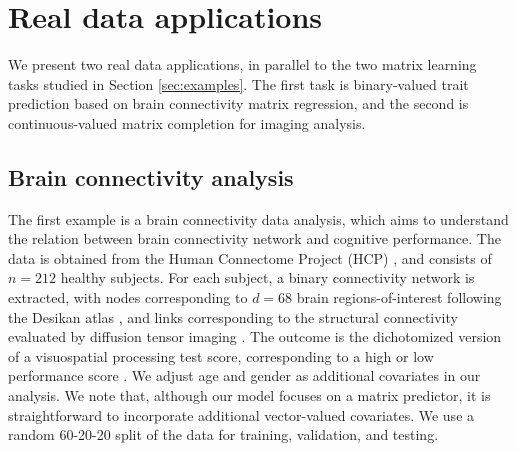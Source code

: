 \documentclass[aos]{imsart}
\theoremstyle{definition}
\begin{document}
\section{Real data applications}
\label{sec:realdata}

We present two real data applications, in parallel to the two matrix learning tasks studied in Section \ref{sec:examples}. The first task is binary-valued trait prediction based on brain connectivity matrix regression, and the second is continuous-valued matrix completion for imaging analysis. 



\subsection{Brain connectivity analysis}
\label{sec:brain}

The first example is a brain connectivity data analysis, which aims to understand the relation between brain connectivity network and cognitive performance. The data is obtained from the Human Connectome Project (HCP) \cite{van2013wu}, and consists of $n=212$ healthy subjects. For each subject, a binary connectivity network is extracted, with nodes corresponding to $d=68$ brain regions-of-interest following the Desikan atlas \cite{desikan2006automated}, and links corresponding to the structural connectivity evaluated by diffusion tensor imaging \cite{zhang2018mapping}. The outcome is the dichotomized version of a visuospatial processing test score, corresponding to a high or low performance score \cite{wang2019common}. We adjust age and gender as additional covariates in our analysis. We note that, although our model focuses on a matrix predictor, it is straightforward to incorporate additional vector-valued covariates. We use a random 60-20-20 split of the data for training, validation, and testing. 
\end{document}
